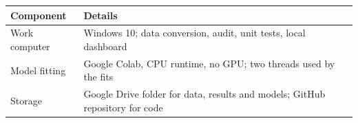 \begin{tabular}{lp{8cm}}
\toprule
\textbf{Component} & \textbf{Details} \\
\midrule
Work computer & Windows 10; data conversion, audit, unit tests, local dashboard \\
Model fitting & Google Colab, CPU runtime, no GPU; two threads used by the fits \\
Storage & Google Drive folder for data, results and models; GitHub repository for code \\
\bottomrule
\end{tabular}

